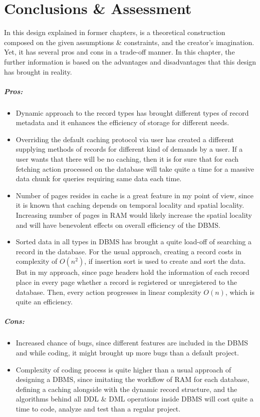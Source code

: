 \documentclass[12pt]{report}
\begin{document}
\chapter{Conclusions \& Assessment}

In this design explained in former chapters, is a theoretical construction composed on the given assumptions \& constraints, and the creator's imagination. Yet, it has several pros and cons in a trade-off manner. In this chapter, the further information is based on the advantages and disadvantages that this design has brought in reality. \\
\paragraph{Pros:}
\begin{itemize}
\item Dynamic approach to the record types has brought different types of record metadata and it enhances the efficiency of storage for different needs.
\item Overriding the default caching protocol via user has created a different supplying methods of records for different kind of demands by a user. If a user wants that there will be no caching, then it is for sure that for each fetching action processed on the database will take quite a time for a massive data chunk for queries requiring same data each time.
\item Number of pages resides in cache is a great feature in my point of view, since it is known that caching depends on temporal locality and spatial locality. Increasing number of pages in RAM would likely increase the spatial locality and will have benevolent effects on overall efficiency of the DBMS. 

\newpage

\item Sorted data in all types in DBMS has brought a quite load-off of searching a record in the database. For the usual approach, creating a record costs in complexity of $O(n^2)$, if insertion sort is used to create and sort the data. But in my approach, since page headers hold the information of each record place in every page whether a record is registered or unregistered to the database. Then, every action progresses in linear complexity $O(n)$, which is quite an efficiency. 
\end{itemize}

\paragraph{Cons:}
\begin{itemize}
\item Increased chance of bugs, since different features are included in the DBMS and while coding, it might brought up more bugs than a default project.
\item Complexity of coding process is quite higher than a usual approach of designing a DBMS, since imitating the workflow of RAM for each database, defining a caching alongside with the dynamic record structure, and the algorithms behind all DDL \& DML operations inside DBMS will cost quite a time to code, analyze and test than a regular project.
\end{itemize}
\end{document}
